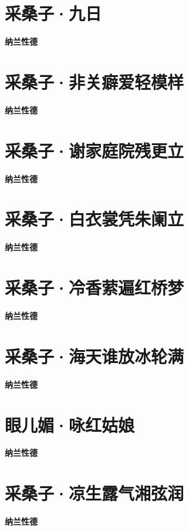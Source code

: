 \documentclass[12pt,a4paper]{ctexbook}
\begin{document}
\section{采桑子·九日}
\textbf{纳兰性德}\par\vspace{0.5em}

\section{采桑子·非关癖爱轻模样}
\textbf{纳兰性德}\par\vspace{0.5em}

\section{采桑子·谢家庭院残更立}
\textbf{纳兰性德}\par\vspace{0.5em}

\section{采桑子·白衣裳凭朱阑立}
\textbf{纳兰性德}\par\vspace{0.5em}

\section{采桑子·冷香萦遍红桥梦}
\textbf{纳兰性德}\par\vspace{0.5em}

\section{采桑子·海天谁放冰轮满}
\textbf{纳兰性德}\par\vspace{0.5em}

\section{眼儿媚·咏红姑娘}
\textbf{纳兰性德}\par\vspace{0.5em}

\section{采桑子·凉生露气湘弦润}
\textbf{纳兰性德}\par\vspace{0.5em}
\end{document}
